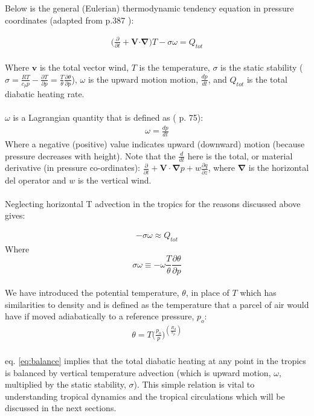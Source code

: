 \documentclass[letterpaper,12pt,titlepage,oneside,final]{book}
\begin{document}
Below is the general (Eulerian) thermodynamic tendency equation in pressure coordinates (adapted from p.387 \citep{holton_introduction_2004}):

\begin{align}
\Big(\frac{\partial}{\partial{t}}+\mathbf{V}\boldsymbol{\cdot} \mathbf{\nabla}\Big)T - \sigma\omega =Q_{tot}
\end{align}
\\
Where $\mathbf{v}$ is the total vector wind, $T$ is the temperature, $\sigma$ is the static stability ($\sigma=\frac{RT}{c_{p}p} - \frac{\partial{T}}{\partial{p}} = \frac{T}{\theta}\frac{\partial{\theta}}{\partial{p}}$), $\omega$ is the upward motion motion, $\frac{dp}{dt}$, and $Q_{tot}$ is the total diabatic heating rate. 
\\
\\
$\omega$ is a Lagrangian quantity that is defined as (\cite{holton_introduction_2004} p. 75):
\begin{align}\label{omega}
\omega=\frac{dp}{dt}
\end{align}
Where a negative (positive) value indicates upward (downward) motion (because pressure decreases with height). Note that the $\frac{d}{dt}$ here is the total, or material derivative (in pressure co-ordinates): $\frac{\partial}{\partial{t}} + \mathbf{V}\cdot\mathbf{\nabla}p + w\frac{\partial{q}}{\partial{z}}$, where $\mathbf{\nabla}$ is the horizontal del operator and $w$ is the vertical wind.
\\
\\
Neglecting horizontal T advection in the tropics for the reasons discussed above gives:

\begin{align}\label{eq:balance}
-\sigma\omega \approx{Q_{tot}}
\end{align}
Where
\begin{equation}\label{eq:sp}
  \sigma\omega\equiv-\omega\frac{T}{\theta}\frac{\partial{\theta}}{\partial{p}}
\end{equation}
\\
We have introduced the potential temperature, $\theta$, in place of $T$ which has similarities to density and is defined as the temperature that a parcel of air would have if moved adiabatically to a reference pressure, $p_{o}$:
\begin{align}
\theta=T\Big(\frac{p_{o}}{p}\Big)^{(\frac{R_{d}}{c_{p}})}
\end{align}
\\
eq. \ref{eq:balance} implies that the total diabatic heating at any point in the tropics is balanced by vertical temperature advection (which is upward motion, $\omega$, multiplied by the static stability, $\sigma$).
This simple relation is vital to understanding tropical dynamics and the tropical circulations which will be discussed in the next sections.
\end{document}
